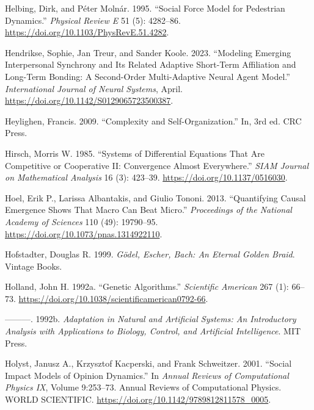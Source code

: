 \documentclass[
  a4paper,
  DIV=11,
  numbers=noendperiod,
  oneside]{scrreprt}
\newlength{\cslhangindent}
\newlength{\cslentryspacingunit} %
\newenvironment{CSLReferences}[2] %
 {%
  \setlength{\parindent}{0pt}
  \ifodd #1
  \let\oldpar\par
  \def\par{\hangindent=\cslhangindent\oldpar}
  \fi
  \setlength{\parskip}{#2\cslentryspacingunit}
 }%
 {}
\begin{document}
\begin{CSLReferences}{1}{0}
\leavevmode{}%
Helbing, Dirk, and Péter Molnár. 1995. {``Social Force Model for
Pedestrian Dynamics.''} \emph{Physical Review E} 51 (5): 4282--86.
\url{https://doi.org/10.1103/PhysRevE.51.4282}.

\leavevmode{}%
Hendrikse, Sophie, Jan Treur, and Sander Koole. 2023. {``Modeling
{Emerging Interpersonal Synchrony} and Its {Related Adaptive Short-Term
Affiliation} and {Long-Term Bonding}: {A Second-Order Multi-Adaptive
Neural Agent Model}.''} \emph{International Journal of Neural Systems},
April. \url{https://doi.org/10.1142/S0129065723500387}.

\leavevmode{}%
Heylighen, Francis. 2009. {``Complexity and Self-Organization.''} In,
3rd ed. CRC Press.

\leavevmode{}%
Hirsch, Morris W. 1985. {``Systems of {Differential Equations} That Are
{Competitive} or {Cooperative II}: {Convergence Almost Everywhere}.''}
\emph{SIAM Journal on Mathematical Analysis} 16 (3): 423--39.
\url{https://doi.org/10.1137/0516030}.

\leavevmode{}%
Hoel, Erik P., Larissa Albantakis, and Giulio Tononi. 2013.
{``Quantifying Causal Emergence Shows That Macro Can Beat Micro.''}
\emph{Proceedings of the National Academy of Sciences} 110 (49):
19790--95. \url{https://doi.org/10.1073/pnas.1314922110}.

\leavevmode{}%
Hofstadter, Douglas R. 1999. \emph{Gödel, {Escher}, {Bach}: {An Eternal
Golden Braid}}. {Vintage Books}.

\leavevmode{}%
Holland, John H. 1992a. {``Genetic {Algorithms}.''} \emph{Scientific
American} 267 (1): 66--73.
\url{https://doi.org/10.1038/scientificamerican0792-66}.

\leavevmode{}%
---------. 1992b. \emph{Adaptation in {Natural} and {Artificial
Systems}: {An Introductory Analysis} with {Applications} to {Biology},
{Control}, and {Artificial Intelligence}}. {MIT Press}.

\leavevmode{}%
Holyst, Janusz A., Krzysztof Kacperski, and Frank Schweitzer. 2001.
{``Social Impact Models of Opinion Dynamics.''} In \emph{Annual
{Reviews} of {Computational Physics IX}}, Volume 9:253--73. Annual
{Reviews} of {Computational Physics}. {WORLD SCIENTIFIC}.
\url{https://doi.org/10.1142/9789812811578_0005}.


\end{CSLReferences}
\end{document}
